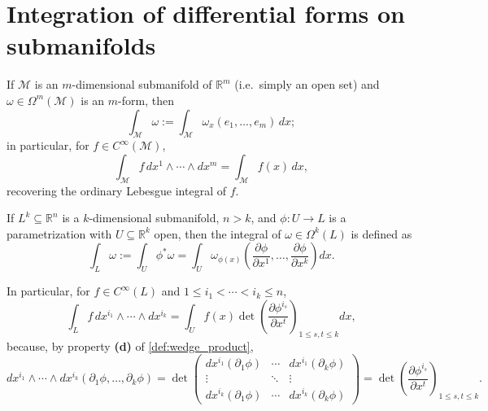 
\section{Integration of differential forms on submanifolds}
\label{sec:integration_of_forms}

If $\mathcal{M}$ is an $m$-dimensional submanifold of $\mathbb{R}^m$ (i.e.\ simply an open set)
and $\omega \in \Omega^m(\mathcal{M})$ is an $m$-form, then
\[\int_{\mathcal{M}} \omega := \int_{\mathcal{M}} \omega_x(e_1,\ldots,e_m)\,dx;\]
in particular, for $f \in C^\infty(\mathcal{M})$,
\[\int_{\mathcal{M}} f\,dx^1\wedge\cdots\wedge dx^m = \int_{\mathcal{M}} f(x)\,dx,\]
recovering the ordinary Lebesgue integral of $f$.

\begin{definition}
\label{def:integral_of_form_over_submanifold}
If $L^k \subseteq \mathbb{R}^n$ is a $k$-dimensional submanifold, $n>k$, and $\phi : U \to L$
is a parametrization with $U \subseteq \mathbb{R}^k$ open, then the integral of $\omega \in
\Omega^k(L)$ is defined as
\[\int_L \omega := \int_U \phi^*\omega = \int_U \omega_{\phi(x)}\!\left(\frac{\partial\phi}
  {\partial x^1},\ldots,\frac{\partial\phi}{\partial x^k}\right) dx.\]
\end{definition}

In particular, for $f \in C^\infty(L)$ and $1\leq i_1<\cdots<i_k\leq n$,
\[\int_L f\,dx^{i_1}\wedge\cdots\wedge dx^{i_k} = \int_U f(x)\det\!\left(\frac{\partial
  \phi^{i_s}}{\partial x^t}\right)_{1\leq s,t\leq k} dx,\]
because, by property \textbf{(d)} of \cref{def:wedge_product},
\[dx^{i_1}\wedge\cdots\wedge dx^{i_k}(\partial_1\phi,\ldots,\partial_k\phi) = \det\!\left(
  \begin{smallmatrix} dx^{i_1}(\partial_1\phi) & \cdots & dx^{i_1}(\partial_k\phi) \\
  \vdots & \ddots & \vdots \\ dx^{i_k}(\partial_1\phi) & \cdots & dx^{i_k}(\partial_k\phi)
  \end{smallmatrix}\right) = \det\!\left(\frac{\partial\phi^{i_s}}{\partial x^t}\right)_{1\leq
  s,t\leq k}.\]

